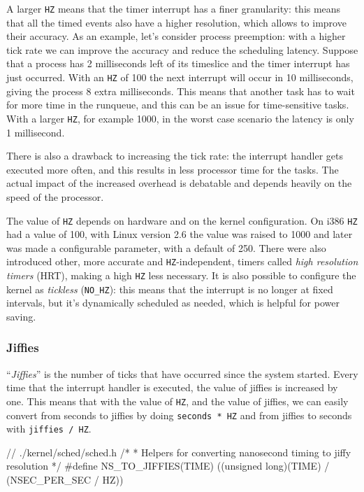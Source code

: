 A larger \texttt{HZ} means that the timer interrupt has a finer granularity: this means that all the timed events also have a higher resolution, which allows to improve their accuracy. As an example, let's consider process preemption: with a higher tick rate we can improve the accuracy and reduce the scheduling latency. Suppose that a process has 2 milliseconds left of its timeslice and the timer interrupt has just occurred. With an \texttt{HZ} of 100 the next interrupt will occur in 10 milliseconds, giving the process 8 extra milliseconds. This means that another task has to wait for more time in the runqueue, and this can be an issue for time-sensitive tasks. With a larger \texttt{HZ}, for example 1000, in the worst case scenario the latency is only 1 millisecond.

There is also a drawback to increasing the tick rate: the interrupt handler gets executed more often, and this results in less processor time for the tasks. The actual impact of the increased overhead is debatable and depends heavily on the speed of the processor.

The value of \texttt{HZ} depends on hardware and on the kernel configuration. On i386 \texttt{HZ} had a value of 100, with Linux version 2.6 the value was raised to 1000 and later was made a configurable parameter, with a default of 250. There were also introduced other, more accurate and \texttt{HZ}-independent, timers called \textit{high resolution timers} (HRT), making a high \texttt{HZ} less necessary. It is also possible to configure the kernel as \textit{tickless} (\verb|NO_HZ|): this means that the interrupt is no longer at fixed intervals, but it's dynamically scheduled as needed, which is helpful for power saving.

\subsubsection{Jiffies}
``\textit{Jiffies}'' is the number of ticks that have occurred since the system started. Every time that the interrupt handler is executed, the value of jiffies is increased by one. This means that with the value of \texttt{HZ}, and the value of jiffies, we can easily convert from seconds to jiffies by doing \verb|seconds * HZ| and from jiffies to seconds with \verb|jiffies / HZ|.
\begin{code}
// ./kernel/sched/sched.h
/*
 * Helpers for converting nanosecond timing to jiffy resolution
 */
#define NS_TO_JIFFIES(TIME) ((unsigned long)(TIME) / (NSEC_PER_SEC / HZ))
\end{code}

